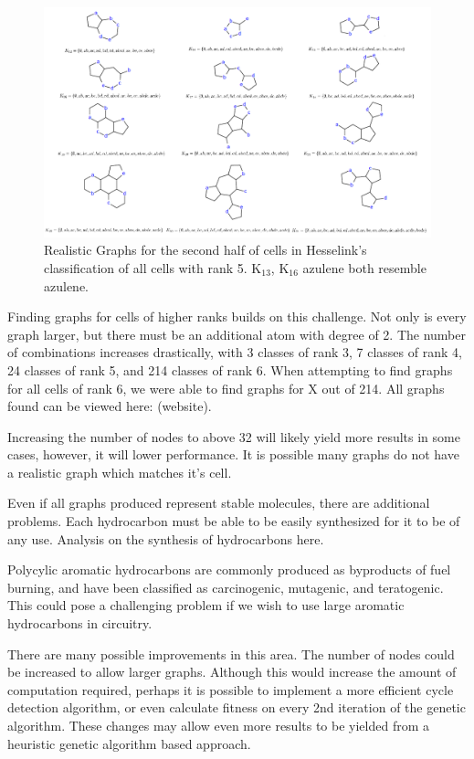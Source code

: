 \documentclass[12pt]{article}
\begin{document}
\begin{figure}[ht!]
\centering
\includegraphics[width=160mm]{rank5Results2.png}
\caption{Realistic Graphs for the second half of cells in Hesselink's classification of all cells with rank 5. K$_{13}$, K$_{16}$ azulene both resemble azulene.}
\label{fig:rank5Results2}
\end{figure}

Finding graphs for cells of higher ranks builds on this challenge. Not only is every graph larger, but there must be an additional atom with degree of 2. The number of combinations increases drastically, with 3 classes of rank 3, 7 classes of rank 4, 24 classes of rank 5, and 214 classes of rank 6. When attempting to find graphs for all cells of rank 6, we were able to find graphs for X out of 214. All graphs found can be viewed here: (website).

Increasing the number of nodes to above 32 will likely yield more results in some cases, however, it will lower performance. It is possible many graphs do not have a realistic graph which matches it's cell.

Even if all graphs produced represent stable molecules, there are additional problems. Each hydrocarbon must be able to be easily synthesized for it to be of any use. Analysis on the synthesis of hydrocarbons here.

Polycylic aromatic hydrocarbons are commonly produced as byproducts of fuel burning, and have been classified as carcinogenic, mutagenic, and teratogenic. This could pose a challenging problem if we wish to use large aromatic hydrocarbons in circuitry. 

There are many possible improvements in this area. The number of nodes could be increased to allow larger graphs. Although this would increase the amount of computation required, perhaps it is possible to implement a more efficient cycle detection algorithm, or even calculate fitness on every 2nd iteration of the genetic algorithm. These changes may allow even more results to be yielded from a heuristic genetic algorithm based approach.
\end{document}
